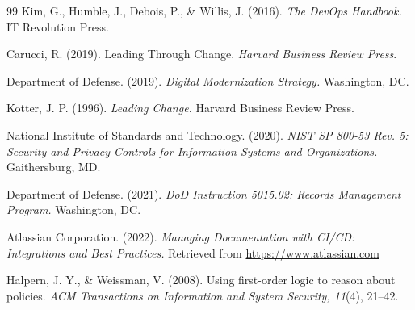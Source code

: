 \documentclass[11pt]{article}
\begin{document}
\begin{thebibliography}{99}
		Kim, G., Humble, J., Debois, P., \& Willis, J. (2016). \textit{The DevOps Handbook.} IT Revolution Press.

		Carucci, R. (2019). Leading Through Change. \textit{Harvard Business Review Press}.

		Department of Defense. (2019). \textit{Digital Modernization Strategy.} Washington, DC.

		Kotter, J. P. (1996). \textit{Leading Change.} Harvard Business Review Press.

		National Institute of Standards and Technology. (2020). \textit{NIST SP 800-53 Rev. 5: Security and Privacy Controls for Information Systems and Organizations.} Gaithersburg, MD.

		Department of Defense. (2021). \textit{DoD Instruction 5015.02: Records Management Program.} Washington, DC.

		Atlassian Corporation. (2022). \textit{Managing Documentation with CI/CD: Integrations and Best Practices.} Retrieved from \url{https://www.atlassian.com}

		Halpern, J. Y., \& Weissman, V. (2008). Using first-order logic to reason about policies. \textit{ACM Transactions on Information and System Security, 11}(4), 21--42.

	\end{thebibliography}
\end{document}
